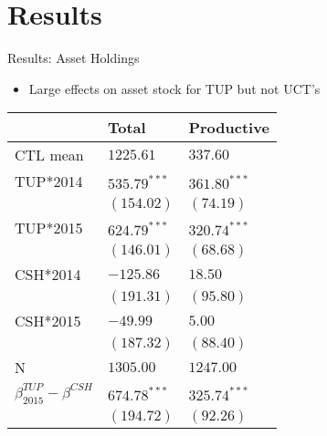 \documentclass[t,presentation]{beamer}
\begin{document}
\section*{Results}
\label{sec:orgheadline22}

\begin{frame}[label={sec:orgheadline13}]{Results: Asset Holdings}
\begin{itemize}
\item Large effects on asset stock for TUP but not UCT's
\end{itemize}

\begin{center}
\begin{tabular}{lll}
\hline
 & Total & Productive\\
\hline
CTL mean & \(1225.61\) & \(337.60\)\\
\hline
TUP*2014 & \(535.79^{***}\) & \(361.80^{***}\)\\
 & \((154.02)\) & \((74.19)\)\\
TUP*2015 & \(624.79^{***}\) & \(320.74^{***}\)\\
 & \((146.01)\) & \((68.68)\)\\
CSH*2014 & \(-125.86\) & \(18.50\)\\
 & \((191.31)\) & \((95.80)\)\\
CSH*2015 & \(-49.99\) & \(5.00\)\\
 & \((187.32)\) & \((88.40)\)\\
\hline
N & \(1305.00\) & \(1247.00\)\\
\hline
\(\beta^{TUP}_{2015}-\beta^{CSH}\) & \(674.78^{***}\) & \(325.74^{***}\)\\
 & \((194.72)\) & \((92.26)\)\\
\hline
\end{tabular}
\end{center}
\end{frame}
\end{document}

